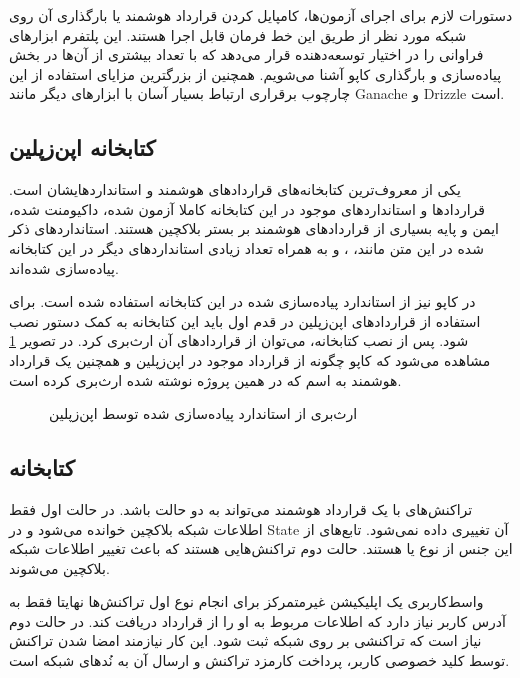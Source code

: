 دستورات لازم برای اجرای آزمون‌ها،
کامپایل کردن قرارداد هوشمند یا بارگذاری آن روی شبکه مورد نظر از طریق این خط فرمان قابل اجرا هستند.
این پلتفرم ابزارهای فراوانی را در اختیار توسعه‌دهنده قرار می‌دهد
که با تعداد بیشتری از آن‌ها در بخش پیاده‌سازی و بارگذاری کاپو آشنا می‌شویم.
همچنین از بزرگترین مزایای استفاده از این چارچوب برقراری ارتباط بسیار آسان با ابزارهای دیگر مانند
\gls{Ganache}
و
\gls{Drizzle}
است.

\subsection{کتابخانه اپن‌زپلین}
یکی از معروف‌ترین کتابخانه‌های قراردادهای هوشمند و استانداردهایشان است.
قراردادها و استانداردهای موجود در این کتابخانه
کاملا آزمون شده، داکیومنت شده، ایمن و پایه بسیاری از قراردادهای هوشمند بر بستر بلاکچین هستند.
استانداردهای ذکر شده در این متن مانند،
،
و
به همراه تعداد زیادی استانداردهای دیگر در این کتابخانه پیاده‌سازی شده‌اند.

در کاپو نیز از استاندارد
پیاده‌سازی شده در این کتابخانه استفاده شده است.
برای استفاده از قرارداد‌های اپن‌زپلین در قدم اول باید این کتابخانه به کمک دستور
نصب شود. پس از نصب کتابخانه، می‌توان از قراردادهای آن ارث‌بری کرد.
در تصویر
\ref{fig:inherit-erc721}
مشاهده می‌شود که کاپو چگونه از قرارداد
موجود در اپن‌زپلین و همچنین یک قرارداد هوشمند به اسم
که در همین پروژه نوشته شده ارث‌بری کرده است.

\begin{figure}[H]
\centerline{}
\caption{ارث‌بری از استاندارد  پیاده‌سازی شده توسط اپن‌زپلین}
\label{fig:inherit-erc721}
\end{figure}

\subsection{کتابخانه }
تراکنش‌های با یک قرارداد هوشمند می‌تواند به دو حالت باشد.
در حالت اول فقط اطلاعات شبکه بلاکچین خوانده می‌شود و در
\gls{State}
آن تغییری داده نمی‌شود.
تابع‌های از این جنس از نوع
یا
هستند. حالت دوم تراکنش‌هایی هستند که باعث تغییر اطلاعات شبکه بلاکچین می‌شوند.

واسط‌کاربری یک اپلیکیشن غیرمتمرکز برای انجام نوع اول تراکنش‌ها
نهایتا فقط به آدرس کاربر نیاز دارد
که اطلاعات مربوط به او را از قرارداد دریافت کند.
در حالت دوم نیاز است که تراکنشی بر روی شبکه ثبت شود.
این کار نیازمند امضا شدن تراکنش توسط کلید خصوصی کاربر،
پرداخت کارمزد تراکنش و ارسال آن به نُدهای شبکه است.

